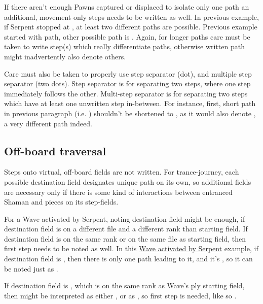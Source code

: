 If there aren't enough Pawns captured or displaced to isolate only one path an
additional, movement-only steps needs to be written as well. In previous example,
if Serpent stopped at , at least two different paths are possible. Previous
example started with  path, other possible path
is . Again, for longer paths care must be taken
to write step(s) which really differentiate paths, otherwise written path might
inadvertently also denote others.

Care must also be taken to properly use step separator  (dot), and multiple
step separator  (two dots). Step separator  is for separating two
steps, where one step immediately follows the other. Multi-step separator 
is for separating two steps which have at least one unwritten step in-between.
For instance, first, short path in previous paragraph (i.e.
) shouldn't be shortened to
, as it would also denote
, a very different path indeed.

\subsection*{Off-board traversal}
\label{sec:Appendix/Notation/Off-board traversal}

Steps onto virtual, off-board fields are not written. For trance-journey, each possible
destination field designates unique path on its own, so additional fields are necessary
only if there is some kind of interactions between entranced Shaman and pieces on its
step-fields.

For a Wave activated by Serpent, noting destination field might be enough, if destination
field is on a different file and a different rank than starting field. If destination field
is on the same rank or on the same file as starting field, then first step needs to be noted
as well. In this \hyperref[fig:scn_tr_34_serpent_activated_wave_ply]{Wave activated by Serpent}
example, if destination field is , then there is only one path leading to it, and
it's , so it can be noted just as .

If destination field is , which is on the same rank as Wave's ply starting field,
then  might be interpreted as either , or as\newline
{}, so first step is needed, like so .

